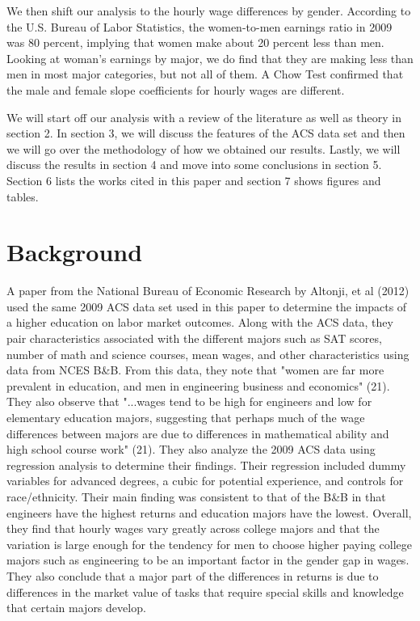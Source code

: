 \documentclass[12pt]{article}
\begin{document}
\par We then shift our analysis to the hourly wage differences by gender. According to the U.S. Bureau of Labor Statistics, the women-to-men earnings ratio in 2009 was 80 percent, implying that women make about 20 percent less than men. Looking at woman's earnings by major, we do find that they are making less than men in most major categories, but not all of them. A Chow Test confirmed that the male and female slope coefficients for hourly wages are different.

\par  We will start off our analysis with a review of the literature as well as theory in section 2. In section 3, we will discuss the features of the ACS data set and then we will go over the methodology of how we obtained our results. Lastly, we will discuss the results in section 4 and move into some conclusions in section 5. Section 6 lists the works cited in this paper and section 7 shows figures and tables.

\section{Background}
\par A paper from the National Bureau of Economic Research by Altonji, et al (2012) used the same 2009 ACS data set used in this paper to determine the impacts of a higher education on labor market outcomes. Along with the ACS data, they pair characteristics associated with the different majors such as SAT scores, number of math and science courses, mean wages, and other characteristics using data from NCES B\&B. From this data, they note that "women are far more prevalent in education, and men in engineering business and economics" (21). They also observe that "...wages tend to be high for engineers and low for elementary education majors, suggesting that perhaps much of the wage differences between majors are due to differences in mathematical ability and high school course work" (21). They also analyze the 2009 ACS data using regression analysis to determine their findings.  Their regression included dummy variables for advanced degrees, a cubic for potential experience, and controls for race/ethnicity. Their main finding was consistent to that of the B\&B in that engineers have the highest returns and education majors have the lowest. Overall, they find that hourly wages vary greatly across college majors and that the variation is large enough for the tendency for men to choose higher paying college majors such as engineering to be an important factor in the gender gap in wages. They also conclude that a major part of the differences in returns is due to differences in the market value of tasks that require special skills and knowledge that certain majors develop.
\end{document}
